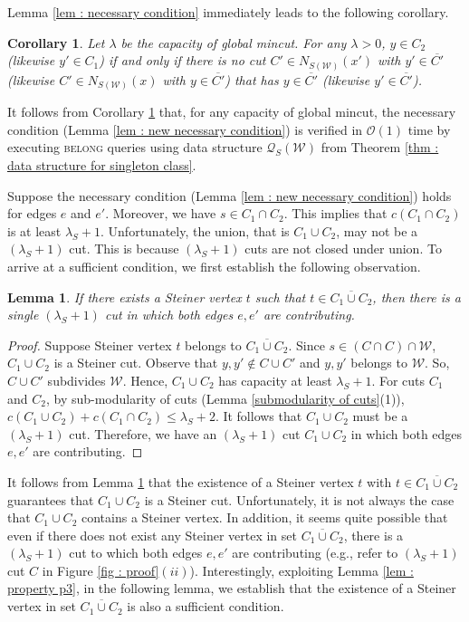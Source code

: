 \documentclass[letterpaper,11pt]{article}
\newtheorem{corollary}{Corollary}[]
\newtheorem{lemma}{Lemma}[]
\begin{document}
Lemma \ref{lem : necessary condition} immediately leads to the following corollary.
\begin{corollary} \label{cor : necessary condition}
    Let $\lambda$ be the capacity of global mincut. For any $\lambda>0$, $y\in C_2$ (likewise $y'\in C_1$) if and only if there is no cut $C'\in N_{S({\mathcal W})}(x')$ with $y'\in \overline{C'}$ (likewise $C'\in N_{S({\mathcal W})}(x)$ with $y\in \overline{C'}$) that has $y\in \overline{C'}$ (likewise $y'\in \overline{C'}$). 
\end{corollary}
It follows from Corollary \ref{cor : necessary condition} that, for any capacity of global mincut, the necessary condition (Lemma \ref{lem : new necessary condition}) is verified in ${\mathcal O}(1)$ time by executing \textsc{belong} queries using data structure ${\mathcal Q}_S({\mathcal W})$ from Theorem \ref{thm : data structure for singleton class}.  

Suppose the necessary condition (Lemma \ref{lem : new necessary condition}) holds for edges $e$ and $e'$. Moreover, we have $s\in C_1\cap C_2$. This implies that $c(C_1\cap C_2)$ is at least $\lambda_S+1$. Unfortunately, the union, that is $C_1\cup C_2$, may not be a $(\lambda_S+1)$ cut. This is because $(\lambda_S+1)$ cuts are not closed under union.
To arrive at a sufficient condition, we first establish the following observation.
\begin{lemma} \label{lem : existence of a steiner vertex}
    If there exists a Steiner vertex $t$ such that $t\in \overline{C_1\cup C_2}$, then there is a single $(\lambda_S+1)$ cut in which both edges $e,e'$ are contributing. 
\end{lemma}
\begin{proof}
    Suppose Steiner vertex $t$ belongs to $\overline{C_1\cup C_2}$. Since $s\in (C\cap C)\cap {\mathcal W}$, $C_1\cup C_2$ is a Steiner cut. Observe that $y,y'\notin C\cup C'$ and $y,y'$ belongs to ${\mathcal W}$. So, $C\cup C'$ subdivides ${\mathcal W}$. Hence, $C_1\cup C_2$ has capacity at least $\lambda_S+1$. For cuts $C_1$ and $C_2$, by sub-modularity of cuts (Lemma \ref{submodularity of cuts}(1)), $c(C_1\cup C_2)+c(C_1\cap C_2)\le \lambda_S+2$. It follows that $C_1\cup C_2$ must be a $(\lambda_S+1)$ cut. Therefore, we have an $(\lambda_S+1)$ cut $C_1\cup C_2$ in which both edges $e,e'$ are contributing. 
\end{proof}
It follows from Lemma \ref{lem : existence of a steiner vertex} that the existence of a Steiner vertex $t$ with $t\in \overline{C_1 \cup C_2}$ guarantees that $C_1\cup C_2$ is a Steiner cut. Unfortunately, it is not always the case that $C_1\cup C_2$ contains a Steiner vertex. In addition, it seems quite possible that even if there does not exist any Steiner vertex in set $\overline{C_1\cup C_2}$, there is a $(\lambda_S+1)$ cut to which both edges $e,e'$ are contributing (e.g., refer to $(\lambda_S+1)$ cut $C$ in Figure \ref{fig : proof}$(ii)$). Interestingly, exploiting Lemma \ref{lem : property p3}, in the following lemma, we establish that the existence of a Steiner vertex in set $\overline{C_1\cup C_2}$ is also a sufficient condition.  
\end{document}
